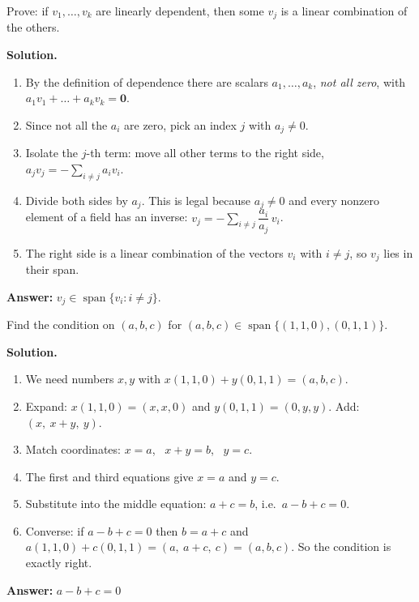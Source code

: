 \documentclass[11pt]{article}
\begin{document}
\begin{tcolorbox}[colback=white,colframe=ink!60,title={\bfseries Example 7 \textperiodcentered\ Proof: dependence means one vector is redundant}]Prove: if $v_1,\dots,v_k$ are linearly dependent, then some $v_j$ is a linear combination of the others.
\par\smallskip
\textbf{Solution.} \begin{enumerate}[leftmargin=1.6em,itemsep=1pt,topsep=2pt,label=\arabic*.]\item By the definition of dependence there are scalars $a_1,\dots,a_k$, \emph{not all zero}, with $a_1v_1+\dots+a_kv_k=\mathbf 0$.
\item Since not all the $a_i$ are zero, pick an index $j$ with $a_j\neq0$.
\item Isolate the $j$-th term: move all other terms to the right side, $a_jv_j=-\sum_{i\neq j}a_iv_i$.
\item Divide both sides by $a_j$. This is legal because $a_j\neq0$ and every nonzero element of a field has an inverse: $v_j=-\sum_{i\neq j}\dfrac{a_i}{a_j}\,v_i$.
\item The right side is a linear combination of the vectors $v_i$ with $i\ne j$, so $v_j$ lies in their span.
\end{enumerate}\textbf{Answer:} $v_j\in\operatorname{span}\{v_i:i\neq j\}$.
\end{tcolorbox}
\begin{tcolorbox}[colback=white,colframe=ink!60,title={\bfseries Example 8 \textperiodcentered\ Describing a span by an equation}]Find the condition on $(a,b,c)$ for $(a,b,c)\in\operatorname{span}\{(1,1,0),(0,1,1)\}$.
\par\smallskip
\textbf{Solution.} \begin{enumerate}[leftmargin=1.6em,itemsep=1pt,topsep=2pt,label=\arabic*.]\item We need numbers $x,y$ with $x(1,1,0)+y(0,1,1)=(a,b,c)$.
\item Expand: $x(1,1,0)=(x,x,0)$ and $y(0,1,1)=(0,y,y)$. Add: $(x,\ x+y,\ y)$.
\item Match coordinates: $x=a$, \ $x+y=b$, \ $y=c$.
\item The first and third equations give $x=a$ and $y=c$.
\item Substitute into the middle equation: $a+c=b$, i.e.\ $a-b+c=0$.
\item Converse: if $a-b+c=0$ then $b=a+c$ and $a(1,1,0)+c(0,1,1)=(a,\ a+c,\ c)=(a,b,c)$. So the condition is exactly right.
\end{enumerate}\textbf{Answer:} $a-b+c=0$
\end{tcolorbox}
\newpage
\end{document}

